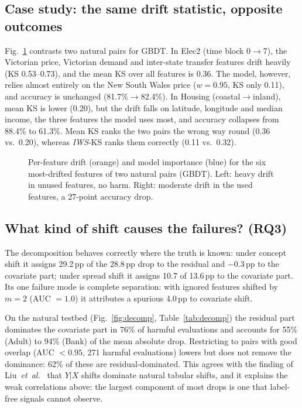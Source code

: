 \documentclass[conference]{IEEEtran}
\theoremstyle{plainhead}
\newcommand{\iws}{\textit{IWS}}
\newcommand{\pp}{\,pp\xspace}
\begin{document}
\subsection{Case study: the same drift statistic, opposite outcomes}
Fig.~\ref{fig:case} contrasts two natural pairs for GBDT. In Elec2 (time block 0$\to$7), the Victorian price, Victorian demand and inter-state transfer features drift heavily (KS 0.53--0.73), and the mean KS over all features is 0.36. The model, however, relies almost entirely on the New South Wales price ($w=0.95$, KS only 0.11), and accuracy is unchanged (81.7\%$\to$82.4\%). In Housing (coastal$\to$inland), mean KS is lower (0.20), but the drift falls on latitude, longitude and median income, the three features the model uses most, and accuracy collapses from 88.4\% to 61.3\%. Mean KS ranks the two pairs the wrong way round (0.36 vs.\ 0.20), whereas \iws{}-KS ranks them correctly (0.11 vs.\ 0.32).

\begin{figure}[t]
\centering

\caption{Per-feature drift (orange) and model importance (blue) for the six most-drifted features of two natural pairs (GBDT). Left: heavy drift in unused features, no harm. Right: moderate drift in the used features, a 27-point accuracy drop.}
\label{fig:case}
\end{figure}

\subsection{What kind of shift causes the failures? (RQ3)}
The decomposition behaves correctly where the truth is known: under concept shift it assigns 29.2\pp of the 28.8\pp drop to the residual and $-0.3$\pp to the covariate part; under spread shift it assigns 10.7 of 13.6\pp to the covariate part. Its one failure mode is complete separation: with ignored features shifted by $m=2$ (AUC $=1.0$) it attributes a spurious 4.0\pp to covariate shift.

On the natural testbed (Fig.~\ref{fig:decomp}, Table~\ref{tab:decomp}) the residual part dominates the covariate part in 76\% of harmful evaluations and accounts for 55\% (Adult) to 94\% (Bank) of the mean absolute drop. Restricting to pairs with good overlap (AUC $<0.95$, 271 harmful evaluations) lowers but does not remove the dominance: 62\% of these are residual-dominated. This agrees with the finding of Liu~\textit{et~al.}~\cite{liu2023need} that $Y|X$ shifts dominate natural tabular shifts, and it explains the weak correlations above: the largest component of most drops is one that label-free signals cannot observe.
\end{document}
